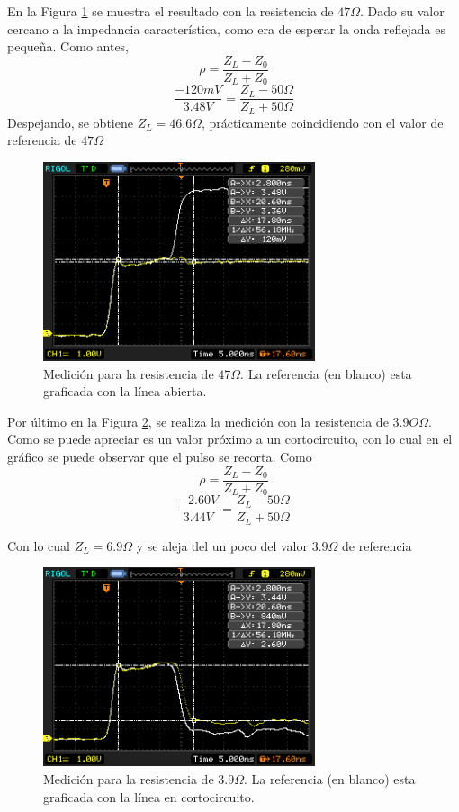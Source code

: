 \documentclass[a4paper,10pt]{article}
\begin{document}
	\indent En la Figura \ref{img004} se muestra el resultado con la 
	resistencia de $47\Omega$. Dado su valor cercano a la impedancia 
	caracter\'istica, como era de esperar la onda reflejada es peque\~na. Como
	antes, $$\rho=\frac{Z_L-Z_0}{Z_L+Z_0}$$
	$$\frac{-120mV}{3.48V}=\frac{Z_L- 50\Omega}{Z_L+50\Omega}$$
	\indent Despejando, se obtiene $Z_L=46.6\Omega$, pr\'acticamente 
	coincidiendo con el valor de referencia de $47\Omega$
	
		\begin{figure}[!htb]
			\centering
			\includegraphics[width=8cm]
			{Imagenes/Res47.png}
			\caption{Medici\'on para la resistencia de $47\Omega$. La 
			referencia (en blanco) esta graficada con la l\'inea abierta.}
			\label{img004}
		\end{figure}

	\indent Por \'ultimo en la Figura \ref{img005}, se realiza la medici\'on 
	con la resistencia de $3.9O\Omega$. Como se puede apreciar es un valor 
	pr\'oximo a un cortocircuito, con lo cual en el gr\'afico se puede 
	observar que el pulso se recorta. Como $$\rho=\frac{Z_L-Z_0}{Z_L+Z_0}$$
	$$\frac{-2.60V}{3.44V}=\frac{Z_L- 50\Omega}{Z_L+50\Omega}$$
	
	\indent Con lo cual $Z_L=6.9\Omega$ y se aleja del un poco del valor 
	$3.9\Omega$ de referencia
		
		\begin{figure}[!htb]
			\centering
			\includegraphics[width=8cm]
			{Imagenes/Res3e9.png}
			\caption{Medici\'on para la resistencia de $3.9\Omega$. La 
			referencia (en blanco) esta graficada con la l\'inea en 
			cortocircuito.}
			\label{img005}
		\end{figure}
\end{document}
